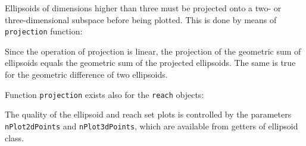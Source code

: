 Ellipsoids of dimensions higher than three must be
projected onto a two- or three-dimensional subspace before being plotted.
This is done by means of {\tt projection} function:

Since the operation of projection is linear, the projection of the geometric
sum of ellipsoids equals the geometric sum of the projected ellipsoids.
The same is true for the geometric difference of two ellipsoids.

Function {\tt projection} exists also for the {\tt reach} objects:

The quality of the ellipsoid and reach set plots is controlled by the
parameters {\tt nPlot2dPoints} and {\tt nPlot3dPoints}, which are available
from getters of ellipsoid class.